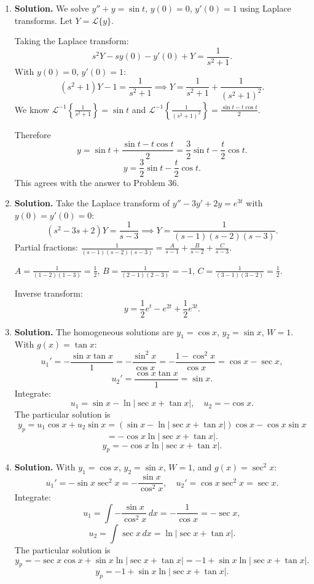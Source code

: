 \begin{enumerate}
\item \textbf{Solution.}
We solve $y''+y=\sin t$, $y(0)=0$, $y'(0)=1$ using Laplace transforms. Let $Y=\mathcal{L}\{y\}$.

Taking the Laplace transform:
\[
s^2Y - sy(0)-y'(0)+Y = \frac{1}{s^2+1}.
\]
With $y(0)=0$, $y'(0)=1$:
\[
(s^2+1)Y - 1 = \frac{1}{s^2+1} \implies Y = \frac{1}{s^2+1}+\frac{1}{(s^2+1)^2}.
\]
We know $\mathcal{L}^{-1}\!\left\{\frac{1}{s^2+1}\right\}=\sin t$ and $\mathcal{L}^{-1}\!\left\{\frac{1}{(s^2+1)^2}\right\}=\frac{\sin t - t\cos t}{2}$.

Therefore
\[
y = \sin t + \frac{\sin t - t\cos t}{2} = \frac{3}{2}\sin t - \frac{t}{2}\cos t.
\]
\[
\boxed{y = \frac{3}{2}\sin t - \frac{t}{2}\cos t}.
\]
This agrees with the answer to Problem 36.

\item \textbf{Solution.}
Take the Laplace transform of $y''-3y'+2y=e^{3t}$ with $y(0)=y'(0)=0$:
\[
(s^2-3s+2)Y = \frac{1}{s-3} \implies Y = \frac{1}{(s-1)(s-2)(s-3)}.
\]
Partial fractions: $\frac{1}{(s-1)(s-2)(s-3)}=\frac{A}{s-1}+\frac{B}{s-2}+\frac{C}{s-3}$.

$A=\frac{1}{(1-2)(1-3)}=\frac{1}{2}$, $B=\frac{1}{(2-1)(2-3)}=-1$, $C=\frac{1}{(3-1)(3-2)}=\frac{1}{2}$.

Inverse transform:
\[
\boxed{y = \frac{1}{2}e^t - e^{2t}+\frac{1}{2}e^{3t}}.
\]

\item \textbf{Solution.}
The homogeneous solutions are $y_1=\cos x$, $y_2=\sin x$, $W=1$. With $g(x)=\tan x$:
\[
u_1' = -\frac{\sin x\tan x}{1}=-\frac{\sin^2 x}{\cos x}=-\frac{1-\cos^2 x}{\cos x}=\cos x-\sec x,
\]
\[
u_2' = \frac{\cos x\tan x}{1}=\sin x.
\]
Integrate:
\[
u_1 = \sin x - \ln|\sec x+\tan x|, \quad u_2 = -\cos x.
\]
The particular solution is
\[
y_p = u_1\cos x+u_2\sin x = (\sin x-\ln|\sec x+\tan x|)\cos x - \cos x\sin x
\]
\[
= -\cos x\ln|\sec x+\tan x|.
\]
\[
\boxed{y_p = -\cos x\ln|\sec x+\tan x|}.
\]

\item \textbf{Solution.}
With $y_1=\cos x$, $y_2=\sin x$, $W=1$, and $g(x)=\sec^2 x$:
\[
u_1' = -\sin x\sec^2 x = -\frac{\sin x}{\cos^2 x}, \quad u_2' = \cos x\sec^2 x = \sec x.
\]
Integrate:
\[
u_1 = \int -\frac{\sin x}{\cos^2 x}\,dx = -\frac{1}{\cos x}=-\sec x,
\]
\[
u_2 = \int \sec x\,dx = \ln|\sec x+\tan x|.
\]
The particular solution is
\[
y_p = -\sec x\cos x+\sin x\ln|\sec x+\tan x| = -1+\sin x\ln|\sec x+\tan x|.
\]
\[
\boxed{y_p = -1+\sin x\ln|\sec x+\tan x|}.
\]


\end{enumerate}
